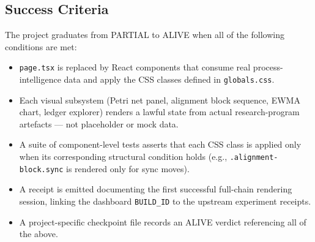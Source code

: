 \subsection{Success Criteria}
\label{sec:experiments-visualizer-nextjs-rq-success}

The project graduates from PARTIAL to ALIVE when all of the following conditions are met:

\begin{itemize}
  \item \texttt{page.tsx} is replaced by React components that consume real process-intelligence
        data and apply the CSS classes defined in \texttt{globals.css}.
  \item Each visual subsystem (Petri net panel, alignment block sequence, EWMA chart, ledger
        explorer) renders a lawful state from actual research-program artefacts --- not
        placeholder or mock data.
  \item A suite of component-level tests asserts that each CSS class is applied only when its
        corresponding structural condition holds (e.g., \texttt{.alignment-block.sync} is
        rendered only for sync moves).
  \item A receipt is emitted documenting the first successful full-chain rendering session,
        linking the dashboard \texttt{BUILD\_ID} to the upstream experiment receipts.
  \item A project-specific checkpoint file records an ALIVE verdict referencing all of the above.
\end{itemize}
